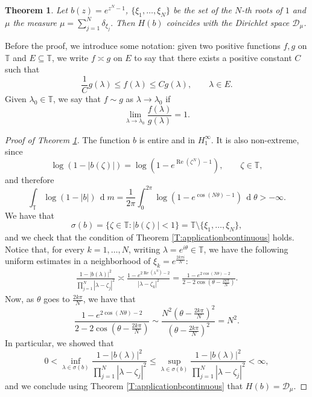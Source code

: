 \documentclass[12pt]{amsart}
\newtheorem{theorem}{Theorem}[section]
\theoremstyle{definition}
\theoremstyle{remark}
\theoremstyle{remark}
\begin{document}
\begin{theorem} \label{T:Hbexp}
    Let $b(z)=e^{z^N-1}$, $\{\xi_1,\ldots,\xi_N\}$ be the set of the $N$-th roots of $1$ and $\mu$ the measure
    $\mu=\sum_{j=1}^N \delta_{\xi_j}.$ Then $H(b)$ coincides with the Dirichlet space $\mathcal{D}_\mu$.
\end{theorem}
Before the proof, we introduce some notation: given two positive functions $f,g$ on $\mathbb{T}$ and $E\subseteq\mathbb{T}$, we write $f\asymp g$ on $E$ to say that there exists a positive constant $C$
such that 
\[\frac{1}{C}g(\lambda)\leq f(\lambda)\leq Cg(\lambda), \qquad\lambda\in E.\]
Given $\lambda_0\in\mathbb{T}$, we say that $f\sim g$ as $\lambda\to\lambda_0$ if 
\[\lim_{\lambda\to\lambda_0}\frac{f(\lambda)}{g(\lambda)}=1.\]
\begin{proof}[Proof of Theorem \ref{T:Hbexp}]
    The function $b$ is entire and in $H^\infty_1$. It is also non-extreme, since
    \[\log(1-|b(\zeta)|)=\log(1-e^{\operatorname{Re}(\zeta^N)-1}), \qquad \zeta\in\mathbb{T},\]
    and therefore
    \[\int_{\mathbb{T}}\log(1-|b|)\,\operatorname{d}\!m=\frac{1}{2\pi} \int_0^{2\pi}\log(1-e^{\cos(N\theta)-1})\,\operatorname{d}\!\theta>-\infty.\]
    We have that 
    \[\sigma(b)=\{\zeta\in\mathbb{T}\colon |b(\zeta)|<1\}=\mathbb{T}\setminus\{\xi_1,\ldots,\xi_N\},\]
and we check that the condition of Theorem \ref{T:applicationbcontinuous} holds. Notice that, for every $k=1,\ldots,N$, writing $\lambda=e^{i\theta}\in\mathbb{T}$, we have the following uniform estimates in a neighborhood of $\xi_k=e^{\frac{2k\pi i}{N}}$:
    \begin{align*}
       \frac{1-|b(\lambda)|^2}{\prod_{j=1}^N|\lambda-\zeta_j|^2}\asymp \frac{1-e^{2\operatorname{Re}(\lambda^N)-2}}{|\lambda-\zeta_k|^2}=\frac{1-e^{2\cos(N\theta)-2}}{2-2\cos(\theta-\frac{2k\pi}{N})}.
    \end{align*}
    Now, as $\theta$ goes to $\frac{2k\pi}{N}$, we have that
    \[\frac{1-e^{2\cos(N\theta)-2}}{2-2\cos(\theta-\frac{2k\pi}{N})} \sim \frac{N^2(\theta-\frac{2k\pi}{N})^2}{(\theta-\frac{2k\pi}{N})^2}=N^2.\]
    In particular, we showed that
   \[0<\inf_{\lambda\in\sigma(b)}\frac{1-|b(\lambda)|^2}{\prod_{j=1}^N|\lambda-\zeta_j|^2}\leq \sup_{\lambda\in\sigma(b)}\frac{1-|b(\lambda)|^2}{\prod_{j=1}^N|\lambda-\zeta_j|^2} <\infty,\]
   and we conclude using Theorem \ref{T:applicationbcontinuous} that $H(b)=\mathcal{D}_\mu.$
\end{proof}



\end{document}
